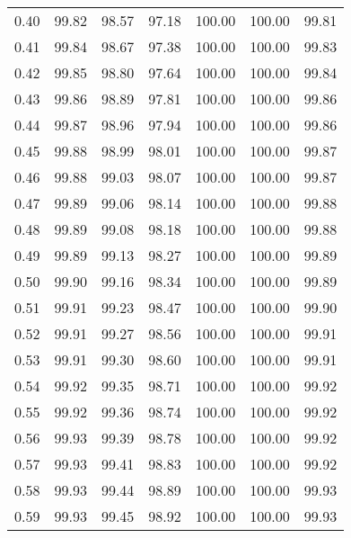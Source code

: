 \begin{tabular}{|c|c|c|c|c|c|c|}
      0.40 &     99.82 &     98.57 &      97.18 &  100.00 &     100.00 &         99.81 \\
      0.41 &     99.84 &     98.67 &      97.38 &  100.00 &     100.00 &         99.83 \\
      0.42 &     99.85 &     98.80 &      97.64 &  100.00 &     100.00 &         99.84 \\
      0.43 &     99.86 &     98.89 &      97.81 &  100.00 &     100.00 &         99.86 \\
      0.44 &     99.87 &     98.96 &      97.94 &  100.00 &     100.00 &         99.86 \\
      0.45 &     99.88 &     98.99 &      98.01 &  100.00 &     100.00 &         99.87 \\
      0.46 &     99.88 &     99.03 &      98.07 &  100.00 &     100.00 &         99.87 \\
      0.47 &     99.89 &     99.06 &      98.14 &  100.00 &     100.00 &         99.88 \\
      0.48 &     99.89 &     99.08 &      98.18 &  100.00 &     100.00 &         99.88 \\
      0.49 &     99.89 &     99.13 &      98.27 &  100.00 &     100.00 &         99.89 \\
      0.50 &     99.90 &     99.16 &      98.34 &  100.00 &     100.00 &         99.89 \\
      0.51 &     99.91 &     99.23 &      98.47 &  100.00 &     100.00 &         99.90 \\
      0.52 &     99.91 &     99.27 &      98.56 &  100.00 &     100.00 &         99.91 \\
      0.53 &     99.91 &     99.30 &      98.60 &  100.00 &     100.00 &         99.91 \\
      0.54 &     99.92 &     99.35 &      98.71 &  100.00 &     100.00 &         99.92 \\
      0.55 &     99.92 &     99.36 &      98.74 &  100.00 &     100.00 &         99.92 \\
      0.56 &     99.93 &     99.39 &      98.78 &  100.00 &     100.00 &         99.92 \\
      0.57 &     99.93 &     99.41 &      98.83 &  100.00 &     100.00 &         99.92 \\
      0.58 &     99.93 &     99.44 &      98.89 &  100.00 &     100.00 &         99.93 \\
      0.59 &     99.93 &     99.45 &      98.92 &  100.00 &     100.00 &         99.93 \\

\end{tabular}
